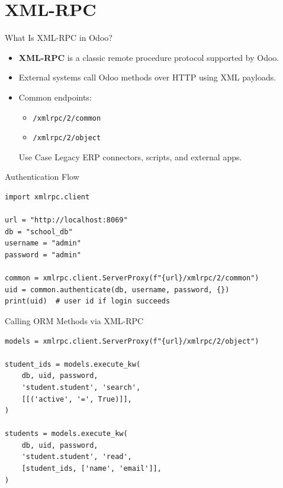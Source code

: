 \section{XML-RPC}

\begin{frame}[fragile]{What Is XML-RPC in Odoo?}
	\begin{itemize}
		\item \textbf{XML-RPC} is a classic remote procedure protocol supported by Odoo.
		\item External systems call Odoo methods over HTTP using XML payloads.
		\item Common endpoints:
		\begin{itemize}
			\item \texttt{/xmlrpc/2/common}
			\item \texttt{/xmlrpc/2/object}
		\end{itemize}
\begin{block}{Use Case}
	Legacy ERP connectors, scripts, and external apps.
\end{block}
	\end{itemize}
\end{frame}

\begin{frame}[fragile]{Authentication Flow}
\begin{lstlisting}
import xmlrpc.client

url = "http://localhost:8069"
db = "school_db"
username = "admin"
password = "admin"

common = xmlrpc.client.ServerProxy(f"{url}/xmlrpc/2/common")
uid = common.authenticate(db, username, password, {})
print(uid)  # user id if login succeeds
\end{lstlisting}
\end{frame}

\begin{frame}[fragile]{Calling ORM Methods via XML-RPC}
\begin{lstlisting}
models = xmlrpc.client.ServerProxy(f"{url}/xmlrpc/2/object")

student_ids = models.execute_kw(
	db, uid, password,
	'student.student', 'search',
	[[('active', '=', True)]],
)

students = models.execute_kw(
	db, uid, password,
	'student.student', 'read',
	[student_ids, ['name', 'email']],
)
\end{lstlisting}
\end{frame}

